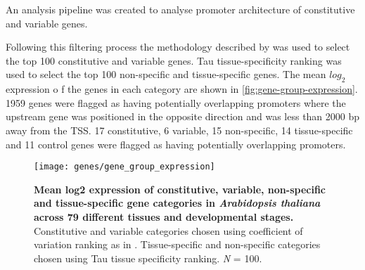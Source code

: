 \documentclass[../main.tex]{subfiles}
\begin{document}
An analysis pipeline was created to analyse promoter architecture of constitutive and variable genes.

Following this filtering process the methodology described by \textcite{czechowskiGenomeWideIdentificationTesting2005} was used to select the top 100 constitutive and variable genes.
Tau tissue\hyp{}specificity ranking was used to select the top 100  non\hyp{}specific and tissue\hyp{}specific genes.
The mean $log_{2}$ expression o
f the genes in each category are shown in \autoref{fig:gene-group-expression}.
1959 genes were flagged as having potentially overlapping promoters where the upstream gene was positioned in the opposite direction and was less than 2000 bp away from the TSS.
17 constitutive, 6 variable, 15 non\hyp{}specific, 14 tissue\hyp{}specific and 11 control genes were flagged as having potentially overlapping promoters.


\begin{figure}[hbt!]
	\begin{center}
		\capstart
		\texttt{[image: genes/gene\_group\_expression]}
		\caption{
			\textbf{Mean log2 expression of constitutive, variable, non\hyp{}specific and tissue\hyp{}specific gene categories in \textit{Arabidopsis thaliana} across 79 different tissues and developmental stages.}
			Constitutive and variable categories chosen using coefficient of variation ranking as in \textcite{czechowskiGenomeWideIdentificationTesting2005}.
			Tissue\hyp{}specific and non\hyp{}specific categories chosen using Tau tissue specificity ranking. \textit{N} = 100.
			\label{fig:gene-group-expression}
		}
	\end{center}
\end{figure}
\end{document}
